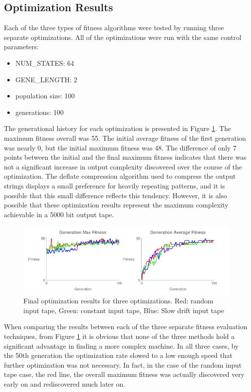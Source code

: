 \subsection{Optimization Results}
Each of the three types of fitness algorithms were tested by running three separate optimizations. All of the optimizations were run with the same control parameters: 
\begin{itemize}
\item NUM\_STATES: 64
\item GENE\_LENGTH: 2
\item population size: 100
\item generations: 100
\end{itemize}
The generational history for each optimization is presented in Figure \ref{fig:results_metrics}. The maximum fitness overall was 55. The initial average fitness of the first generation was nearly 0, but the initial maximum fitness was 48. The difference of only 7 points between the initial and the final maximum fitness indicates that there was not a significant increase in output complexity discovered over the course of the optimization. The deflate compression algorithm used to compress the output strings displays a small preference for heavily repeating patterns, and it is possible that this small difference reflects this tendency. However, it is also possible that these optimization results represent the maximum complexity achievable in a 5000 bit output tape. 


\begin{figure}[!htb]
  \includegraphics[width=.85\textwidth]{images/results_metrics.png}
  \caption{Final optimization results for three optimizations. Red: random input tape, Green: constant input tape, Blue: Slow drift input tape \label{fig:results_metrics}}
\end{figure}

When comparing the results between each of the three separate fitness evaluation techniques, from Figure \ref{fig:results_metrics} it is obvious that none of the three methods hold a significant advantage in finding a more complex machine. In all three cases, by the 50th generation the optimization rate slowed to a low enough speed that further optimization was not necessary. In fact, in the case of the random input tape case, the red line, the overall maximum fitness was actually discovered very early on and rediscovered much later on. 


